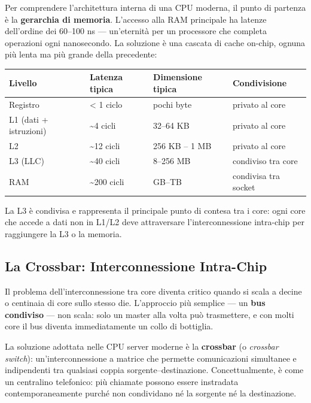 \documentclass[
  italian,
  openany]{book}
\newcounter{none} %
\begin{document}
Per comprendere l'architettura interna di una CPU moderna, il punto di
partenza è la \textbf{gerarchia di memoria}. L'accesso alla RAM
principale ha latenze dell'ordine dei 60--100 ns --- un'eternità per un
processore che completa operazioni ogni nanosecondo. La soluzione è una
cascata di cache on-chip, ognuna più lenta ma più grande della
precedente:

{\def\LTcaptype{none} %
\begin{longtable}[]{@{}llll@{}}
\toprule\noalign{}
Livello & Latenza tipica & Dimensione tipica & Condivisione \\
\midrule\noalign{}
\endhead
\bottomrule\noalign{}
\endlastfoot
Registro & \textless{} 1 ciclo & pochi byte & privato al core \\
L1 (dati + istruzioni) & \textasciitilde4 cicli & 32--64 KB & privato al
core \\
L2 & \textasciitilde12 cicli & 256 KB -- 1 MB & privato al core \\
L3 (LLC) & \textasciitilde40 cicli & 8--256 MB & condiviso tra core \\
RAM & \textasciitilde200 cicli & GB--TB & condivisa tra socket \\
\end{longtable}
}

La L3 è condivisa e rappresenta il principale punto di contesa tra i
core: ogni core che accede a dati non in L1/L2 deve attraversare
l'interconnessione intra-chip per raggiungere la L3 o la memoria.

\subsection{La Crossbar: Interconnessione
Intra-Chip}\label{la-crossbar-interconnessione-intra-chip}

Il problema dell'interconnessione tra core diventa critico quando si
scala a decine o centinaia di core sullo stesso die. L'approccio più
semplice --- un \textbf{bus condiviso} --- non scala: solo un master
alla volta può trasmettere, e con molti core il bus diventa
immediatamente un collo di bottiglia.

La soluzione adottata nelle CPU server moderne è la \textbf{crossbar} (o
\emph{crossbar switch}): un'interconnessione a matrice che permette
comunicazioni simultanee e indipendenti tra qualsiasi coppia
sorgente--destinazione. Concettualmente, è come un centralino
telefonico: più chiamate possono essere instradata contemporaneamente
purché non condividano né la sorgente né la destinazione.
\end{document}
